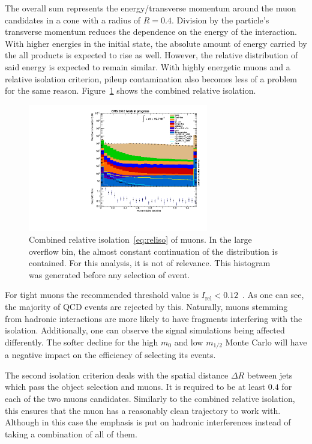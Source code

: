 The overall sum represents the energy/transverse momentum around the muon candidates in a cone with a radius of $R = 0.4$. Division by the particle's transverse momentum reduces the dependence on the energy of the interaction. With higher energies in the initial state, the absolute amount of energy carried by the all products is expected to rise as well. However, the relative distribution of said energy is expected to remain similar. With highly energetic muons and a relative isolation criterion, pileup contamination also becomes less of a problem for the same reason. Figure~\ref{fig:reliso} shows the combined relative isolation.

\begin{figure}[ht!]
  \centering
    \includegraphics[width=0.7\textwidth]{plots/reliso.pdf}
  \caption{Combined relative isolation~\ref{eq:reliso} of muons. In the large overflow bin, the almost constant continuation of the distribution is contained. For this analysis, it is not of relevance. This histogram was generated before any selection of event.}
  \label{fig:reliso}
\end{figure}

\noindent For tight muons the recommended threshold value is $I_{\text{rel}} < 0.12$~\cite{muonpog}. As one can see, the majority of QCD events are rejected by this. Naturally, muons stemming from hadronic interactions are more likely to have fragments interfering with the isolation. Additionally, one can observe the signal simulations being affected differently. The softer decline for the high $m_0$ and low $m_{1/2}$ Monte Carlo will have a negative impact on the efficiency of selecting its events.

The second isolation criterion deals with the spatial distance $\Delta R$ between jets which pass the object selection and muons. It is required to be at least $0.4$ for each of the two muons candidates. Similarly to the combined relative isolation, this ensures that the muon has a reasonably clean trajectory to work with. Although in this case the emphasis is put on hadronic interferences instead of taking a combination of all of them.


